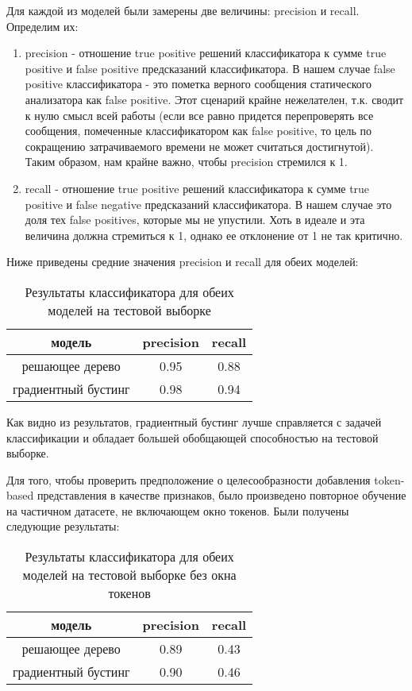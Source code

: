 Для каждой из моделей были замерены две величины: precision и recall. Определим их:

\begin{enumerate}
    \item precision - отношение true positive решений классификатора к сумме true positive и false positive предсказаний классификатора. В нашем случае false positive классификатора - это пометка верного сообщения статического анализатора как false positive. Этот сценарий крайне нежелателен, т.к. сводит к нулю смысл всей работы (если все равно придется перепроверять все сообщения, помеченные классификатором как false positive, то цель по сокращению затрачиваемого времени не может считаться достигнутой). Таким образом, нам крайне важно, чтобы precision стремился к 1.
    \item recall - отношение true positive решений классификатора к сумме true positive и false negative предсказаний классификатора. В нашем случае это доля тех false positives, которые мы не упустили. Хоть в идеале и эта величина должна стремиться к 1, однако ее отклонение от 1 не так критично.
\end{enumerate}

Ниже приведены средние значения precision и recall для обеих моделей:

\begin{table}[H]
    \centering
    \begin{tabular}{|c|c|c|}
        \hline
        модель              & precision & recall \\ \hline
        решающее дерево     & 0.95      & 0.88   \\ \hline
        градиентный бустинг & 0.98      & 0.94   \\ \hline
    \end{tabular}
    \caption{Результаты классификатора для обеих моделей на тестовой выборке}
\end{table}

Как видно из результатов, градиентный бустинг лучше справляется с задачей классификации и обладает большей обобщающей способностью на тестовой выборке.

Для того, чтобы проверить предположение о целесообразности добавления token-based представления в качестве признаков, было произведено повторное обучение на частичном датасете, не включающем окно токенов. Были получены следующие результаты:
\begin{table}[H]
    \centering
    \begin{tabular}{|c|c|c|}
        \hline
        модель              & precision & recall \\ \hline
        решающее дерево     & 0.89      & 0.43   \\ \hline
        градиентный бустинг & 0.90      & 0.46   \\ \hline
    \end{tabular}
    \caption{Результаты классификатора для обеих моделей на тестовой выборке без окна токенов}
\end{table}

